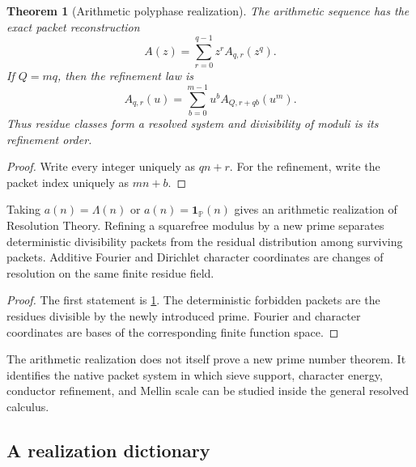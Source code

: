 \documentclass{aomart}
\newtheorem{theorem}{Theorem}[section]
\theoremstyle{definition}
\theoremstyle{remark}
\begin{document}
\begin{theorem}[Arithmetic polyphase realization]\label{thm:arithmetic_polyphase}
The arithmetic sequence has the exact packet reconstruction
\[
 \boxed{
 A(z)
 =
 \sum_{r=0}^{q-1}z^rA_{q,r}(z^q).
 }
\]
If \(Q=mq\), then the refinement law is
\[
 \boxed{
 A_{q,r}(u)
 =
 \sum_{b=0}^{m-1}
 u^bA_{Q,r+qb}(u^m).
 }
\]
Thus residue classes form a resolved system and divisibility of moduli is its refinement order.
\end{theorem}

\begin{proof}
Write every integer uniquely as \(qn+r\). For the refinement, write the packet index uniquely as \(mn+b\).
\end{proof}

\begin{corollary}\label{cor:prime_packet_realization}
Taking \(a(n)=\Lambda(n)\) or \(a(n)=\mathbf 1_{\mathbb P}(n)\) gives an arithmetic realization of Resolution Theory. Refining a squarefree modulus by a new prime separates deterministic divisibility packets from the residual distribution among surviving packets. Additive Fourier and Dirichlet character coordinates are changes of resolution on the same finite residue field.
\end{corollary}

\begin{proof}
The first statement is \cref{thm:arithmetic_polyphase}. The deterministic forbidden packets are the residues divisible by the newly introduced prime. Fourier and character coordinates are bases of the corresponding finite function space.
\end{proof}

\begin{remark}\label{rem:arithmetic_scope}
The arithmetic realization does not itself prove a new prime number theorem. It identifies the native packet system in which sieve support, character energy, conductor refinement, and Mellin scale can be studied inside the general resolved calculus.
\end{remark}

\subsection{A realization dictionary}
\end{document}

